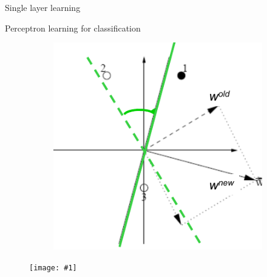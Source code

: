 \documentclass[9pt,t]{beamer}
\newcommand{\picEqHereWidth}[2] { %
    \begin{figure}[htp] 
        \centering
        \texttt{[image: \#1]}
    \end{figure}
}
\begin{document}
\begin{frame}{Single layer learning}
\begin{alertblock}{Perceptron learning for classification}
\begin{figure}[htp!]
\begin{subfigure}{.3\textwidth}
            \end{subfigure}
            \begin{subfigure}{.3\textwidth}
                \centering
                \includegraphics[width=\linewidth]{perceptron_learning3.png}
            \end{subfigure}
        \end{figure}
        \picEqHereWidth{perceptron_learning_eq.png}{0.3\linewidth}
    \end{alertblock}
\end{frame}
\end{document}
